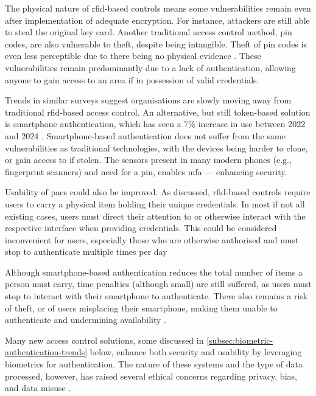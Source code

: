 The physical nature of \ac{rfid}-based controls means some vulnerabilities remain even after implementation of adequate encryption.
For instance, attackers are still able to steal the original key card.
Another traditional access control method, \ac{pin} codes, are also vulnerable to theft, despite being intangible.
Theft of \ac{pin} codes is even less perceptible due to there being no physical evidence \parencite{verkadaGuideSecurePhysical2024}.
These vulnerabilities remain predominantly due to a lack of authentication, allowing anyone to gain access to an area if in possession of valid credentials.

Trends in similar surveys suggest organisations are slowly moving away from traditional \ac{rfid}-based access control.
An alternative, but still token-based solution is smartphone authentication, which has seen a 7\% increase in use between 2022 and 2024 \parencite{ifsecglobal2022StatePhysical2022}.
Smartphone-based authentication does not suffer from the same vulnerabilities as traditional technologies, with the devices being harder to clone, or gain access to if stolen.
The sensors present in many modern phones (e.g., fingerprint scanners) and need for a \ac{pin}, enables \ac{mfa} --- enhancing security.

Usability of \ac{pacs} could also be improved.
As discussed, \ac{rfid}-based controls require users to carry a physical item holding their unique credentials.
In most if not all existing cases, users must direct their attention to or otherwise interact with the respective interface when providing credentials.
This could be considered inconvenient for users, especially those who are otherwise authorised and must stop to authenticate multiple times per day \parencite{ifsecglobalStatePhysicalAccess2024}

Although smartphone-based authentication reduces the total number of items a person must carry,
time penalties (although small) are still suffered, as users must stop to interact with their smartphone to authenticate.
There also remains a risk of theft, or of users misplacing their smartphone, making them unable to authenticate and undermining availability \parencite{maxsentiWhatPhysicalAccess2023}.

Many new access control solutions, some discussed in \ref{subsec:biometric-authentication-trends} below, enhance both security and usability by leveraging biometrics for authentication.
The nature of these systems and the type of data processed, however, has raised several ethical concerns regarding privacy, bias, and data misuse \parencite{prabhakarBiometricRecognitionSecurity2003,uwazuruikePoliceUseLive2025,parliamentaryofficeofscienceandtechnologyBiometricDataMisuse2024}.



